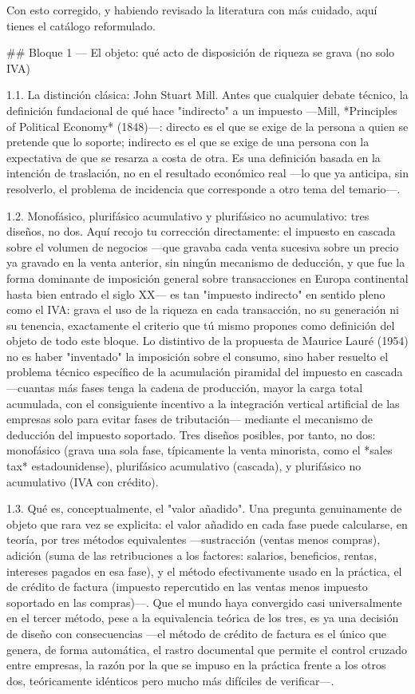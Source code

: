 \documentclass[10pt,a4paper]{article}
\begin{document}
Con esto corregido, y habiendo revisado la literatura con más cuidado, aquí tienes el catálogo reformulado.

## Bloque 1 — El objeto: qué acto de disposición de riqueza se grava (no solo IVA)

1.1. La distinción clásica: John Stuart Mill. Antes que cualquier debate técnico, la definición fundacional de qué hace "indirecto" a un impuesto —Mill, *Principles of Political Economy* (1848)—: directo es el que se exige de la persona a quien se pretende que lo soporte; indirecto es el que se exige de una persona con la expectativa de que se resarza a costa de otra. Es una definición basada en la intención de traslación, no en el resultado económico real —lo que ya anticipa, sin resolverlo, el problema de incidencia que corresponde a otro tema del temario—.

1.2. Monofásico, plurifásico acumulativo y plurifásico no acumulativo: tres diseños, no dos. Aquí recojo tu corrección directamente: el impuesto en cascada sobre el volumen de negocios —que gravaba cada venta sucesiva sobre un precio ya gravado en la venta anterior, sin ningún mecanismo de deducción, y que fue la forma dominante de imposición general sobre transacciones en Europa continental hasta bien entrado el siglo XX— es tan "impuesto indirecto" en sentido pleno como el IVA: grava el uso de la riqueza en cada transacción, no su generación ni su tenencia, exactamente el criterio que tú mismo propones como definición del objeto de todo este bloque. Lo distintivo de la propuesta de Maurice Lauré (1954) no es haber "inventado" la imposición sobre el consumo, sino haber resuelto el problema técnico específico de la acumulación piramidal del impuesto en cascada —cuantas más fases tenga la cadena de producción, mayor la carga total acumulada, con el consiguiente incentivo a la integración vertical artificial de las empresas solo para evitar fases de tributación— mediante el mecanismo de deducción del impuesto soportado. Tres diseños posibles, por tanto, no dos: monofásico (grava una sola fase, típicamente la venta minorista, como el *sales tax* estadounidense), plurifásico acumulativo (cascada), y plurifásico no acumulativo (IVA con crédito).

1.3. Qué es, conceptualmente, el "valor añadido". Una pregunta genuinamente de objeto que rara vez se explicita: el valor añadido en cada fase puede calcularse, en teoría, por tres métodos equivalentes —sustracción (ventas menos compras), adición (suma de las retribuciones a los factores: salarios, beneficios, rentas, intereses pagados en esa fase), y el método efectivamente usado en la práctica, el de crédito de factura (impuesto repercutido en las ventas menos impuesto soportado en las compras)—. Que el mundo haya convergido casi universalmente en el tercer método, pese a la equivalencia teórica de los tres, es ya una decisión de diseño con consecuencias —el método de crédito de factura es el único que genera, de forma automática, el rastro documental que permite el control cruzado entre empresas, la razón por la que se impuso en la práctica frente a los otros dos, teóricamente idénticos pero mucho más difíciles de verificar—.
\end{document}
